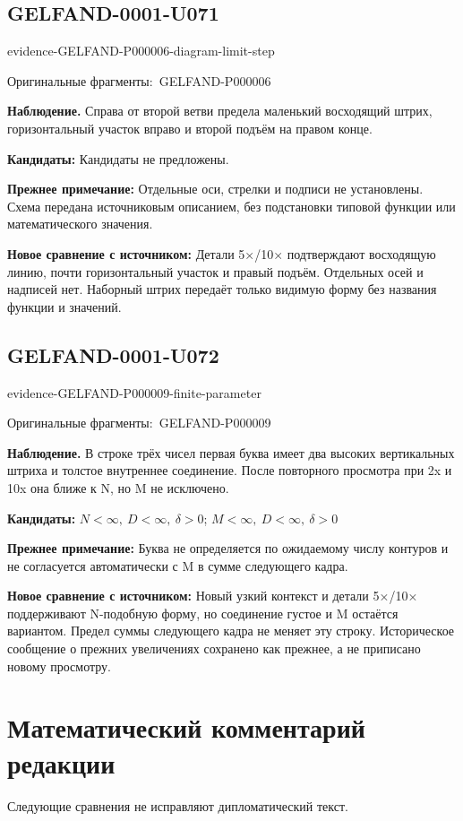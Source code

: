 \documentclass[11pt]{article}
\newcommand{\EvidenceBlock}[4]{%
 \par\smallskip\noindent\begin{minipage}{\linewidth}
 \begin{minipage}[t]{.47\linewidth}\vspace{0pt}\centering
 \csname evidence-#1-#2\endcsname\par
 {\scriptsize\SourceCropCaption\ #1}\par
 \end{minipage}\hfill
 \begin{minipage}[t]{.49\linewidth}\vspace{0pt}\raggedright
 {\small\color{orange!65!black}\textbf{#4} #3}\par
 \end{minipage}
 \end{minipage}\par\smallskip}
\newcommand{\SourceCropCaption}{Оригинальные фрагменты:}\newcommand{\ReadingCaption}{Сомнительное чтение.}\newcommand{\IncompleteCaption}{Неразобранный фрагмент.}\newcommand{\DiagramCaption}{Рисунок и набранное описание.}
\begin{document}
\subsection*{GELFAND-0001-U071}
\EvidenceBlock{GELFAND-P000006}{diagram-limit-step}{Справа от второй ветви предела маленький восходящий штрих, горизонтальный участок вправо и второй подъём на правом конце.}{Наблюдение.}
\par\smallskip\noindent\textbf{Кандидаты: } Кандидаты не предложены.\par
\par\smallskip\noindent\textbf{Прежнее примечание: } Отдельные оси, стрелки и подписи не установлены. Схема передана источниковым описанием, без подстановки типовой функции или математического значения.\par
\par\smallskip\noindent\textbf{Новое сравнение с источником: } Детали 5×/10× подтверждают восходящую линию, почти горизонтальный участок и правый подъём. Отдельных осей и надписей нет. Наборный штрих передаёт только видимую форму без названия функции и значений.\par

\subsection*{GELFAND-0001-U072}
\EvidenceBlock{GELFAND-P000009}{finite-parameter}{В строке трёх чисел первая буква имеет два высоких вертикальных штриха и толстое внутреннее соединение. После повторного просмотра при 2x и 10x она ближе к N, но M не исключено.}{Наблюдение.}
\par\smallskip\noindent\textbf{Кандидаты: } \(N<\infty,\ D<\infty,\ \delta>0\); \(M<\infty,\ D<\infty,\ \delta>0\)\par
\par\smallskip\noindent\textbf{Прежнее примечание: } Буква не определяется по ожидаемому числу контуров и не согласуется автоматически с M в сумме следующего кадра.\par
\par\smallskip\noindent\textbf{Новое сравнение с источником: } Новый узкий контекст и детали 5×/10× поддерживают N-подобную форму, но соединение густое и M остаётся вариантом. Предел суммы следующего кадра не меняет эту строку. Историческое сообщение о прежних увеличениях сохранено как прежнее, а не приписано новому просмотру.\par
\clearpage\section*{Математический комментарий редакции}
Следующие сравнения не исправляют дипломатический текст.
\end{document}
